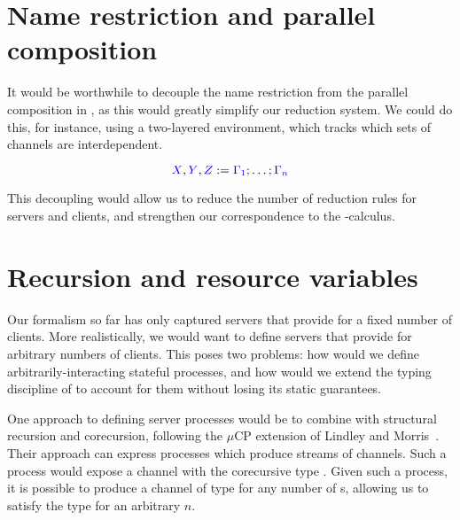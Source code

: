 \section{Name restriction and parallel composition}
It would be worthwhile to decouple the name restriction from the parallel
composition in \cp, as this would greatly simplify our reduction system.
We could do this, for instance, using a two-layered environment, which tracks
which sets of channels are interdependent.
\begin{center}
  \[
    \textcolor{blue}{X}, \textcolor{blue}{Y}, \textcolor{blue}{Z} := \textcolor{blue}{\Gamma_1} ; \dots ; \textcolor{blue}{\Gamma_n}
  \]
  \vspace*{1\baselineskip}
  \begin{prooftree*}
  \end{prooftree*}
  \begin{prooftree*}
  \end{prooftree*}
\end{center}
This decoupling would allow us to reduce the number of reduction rules for
servers and clients, and strengthen our correspondence to the \textpi-calculus.

\section{Recursion and resource variables}
Our formalism so far has only captured servers that provide for a fixed number
of clients.  More realistically, we would want to define servers that provide
for arbitrary numbers of clients.  This poses two problems: how would we define
arbitrarily-interacting stateful processes, and how would we extend the
typing discipline of \nodcap to account for them without losing its static
guarantees.

One approach to defining server processes would be to combine \nodcap with
structural recursion and corecursion, following the $\mu\text{CP}$ extension of Lindley
and Morris~\cite{lindley2016}.  Their approach can express processes which
produce streams of  channels. Such a process would expose a channel with the
corecursive type .  Given such a process, it is
possible to produce a channel of type  for any
number of s, allowing us to satisfy the type  for an arbitrary
$n$.

